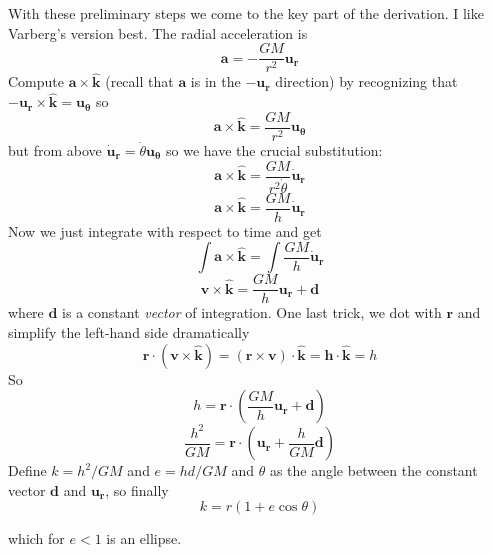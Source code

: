 \documentclass[11pt, oneside]{article}
\begin{document}
With these preliminary steps we come to the key part of the derivation.  I like Varberg's version best.  The radial acceleration is
\[ \mathbf{a} = -\frac{GM}{r^2} \mathbf{u_r} \]
Compute $\mathbf{a} \times \hat{\mathbf{k}}$ (recall that $\mathbf{a}$ is in the $-\mathbf{u_r}$ direction) by recognizing that $-\mathbf{u_r} \times \hat{\mathbf{k}} = \mathbf{u_{\theta}}$ so
\[ \mathbf{a} \times \hat{\mathbf{k}} = \frac{GM}{r^2} \mathbf{u_{\theta}} \]
but from above $\dot{\mathbf{u}}_\mathbf{r} = \dot{\theta} \mathbf{u_{\theta}}$ so we have the crucial substitution:
\[ \mathbf{a} \times \hat{\mathbf{k}} = \frac{GM}{r^2 \dot{\theta} } \dot{\mathbf{u}}_\mathbf{r} \]
\[ \mathbf{a} \times \hat{\mathbf{k}} = \frac{GM}{h} \dot{\mathbf{u}}_\mathbf{r} \]
Now we just integrate with respect to time and get
\[ \int \mathbf{a} \times \hat{\mathbf{k}} = \int \frac{GM}{h} \dot{\mathbf{u}}_\mathbf{r}  \]
\[ \mathbf{v} \times \hat{\mathbf{k}} = \frac{GM}{h} \mathbf{u}_\mathbf{r} + \mathbf{d} \]
where $\mathbf{d}$ is a constant \emph{vector} of integration.
One last trick, we dot with $\mathbf{r}$ and simplify the left-hand side dramatically
\[ \mathbf{r} \cdot ( \mathbf{v} \times \hat{\mathbf{k}}) = (\mathbf{r} \times \mathbf{v}) \cdot  \hat{\mathbf{k}} = \mathbf{h} \cdot \hat{\mathbf{k}} = h \]
So
\[ h = \mathbf{r} \cdot (\frac{GM}{h} \mathbf{u}_\mathbf{r} + \mathbf{d}) \]
\[ \frac{h^2}{GM} = \mathbf{r} \cdot (\mathbf{u}_\mathbf{r} + \frac{h}{GM} \mathbf{d} ) \]
Define $k = h^2/GM$ and $e = hd/GM$ and $\theta$ as the angle between the constant vector $\mathbf{d}$ and $\mathbf{u}_\mathbf{r}$, so finally
\[ k = r (1 + e \cos \theta) \]

which for $e < 1$ is an ellipse.
\end{document}
